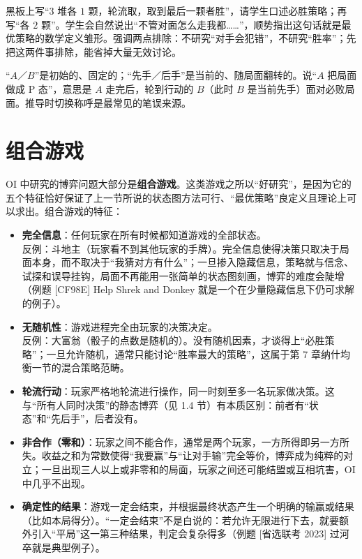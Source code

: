 \documentclass[UTF8,a4paper,11pt,oneside,openany,fontset=fandol]{ctexbook}
\theoremstyle{definition}
\begin{document}
\begin{teach}[导入：从“必胜”这个词开始]
黑板上写“$3$ 堆各 $1$ 颗，轮流取，取到最后一颗者胜”，请学生口述必胜策略；再写“各 $2$ 颗”。学生会自然说出“不管对面怎么走我都……”，顺势指出这句话就是最优策略的数学定义雏形。强调两点排除：不研究“对手会犯错”，不研究“胜率”；先把这两件事排除，能省掉大量无效讨论。
\end{teach}
\begin{pitfall}[两套称呼不要混用]
“$A$／$B$”是初始的、固定的；“先手／后手”是当前的、随局面翻转的。说“$A$ 把局面做成 P 态”，意思是 $A$ 走完后，轮到行动的 $B$（此时 $B$ 是当前先手）面对必败局面。推导时切换称呼是最常见的笔误来源。
\end{pitfall}

\section{组合游戏}
OI 中研究的博弈问题大部分是\textbf{组合游戏}。这类游戏之所以“好研究”，是因为它的五个特征恰好保证了上一节所说的状态图方法可行、“最优策略”良定义且理论上可以求出。组合游戏的特征：
\begin{itemize}
\item \textbf{完全信息}：任何玩家在所有时候都知道游戏的全部状态。\\
反例：斗地主（玩家看不到其他玩家的手牌）。完全信息使得决策只取决于局面本身，而不取决于“我猜对方有什么”；一旦掺入隐藏信息，策略就与信念、试探和误导挂钩，局面不再能用一张简单的状态图刻画，博弈的难度会陡增（例题 [CF98E] Help Shrek and Donkey 就是一个在少量隐藏信息下仍可求解的例子）。
\item \textbf{无随机性}：游戏进程完全由玩家的决策决定。\\
反例：大富翁（骰子的点数是随机的）。没有随机因素，才谈得上“必胜策略”；一旦允许随机，通常只能讨论“胜率最大的策略”，这属于第 7 章纳什均衡一节的混合策略范畴。
\item \textbf{轮流行动}：玩家严格地轮流进行操作，同一时刻至多一名玩家做决策。这与“所有人同时决策”的静态博弈（见 1.4 节）有本质区别：前者有“状态”和“先后手”，后者没有。
\item \textbf{非合作（零和）}：玩家之间不能合作，通常是两个玩家，一方所得即另一方所失。收益之和为常数使得“我要赢”与“让对手输”完全等价，博弈成为纯粹的对立；一旦出现三人以上或非零和的局面，玩家之间还可能结盟或互相坑害，OI 中几乎不出现。
\item \textbf{确定性的结果}：游戏一定会结束，并根据最终状态产生一个明确的输赢或结果（比如本局得分）。“一定会结束”不是白说的：若允许无限进行下去，就要额外引入“平局”这一第三种结果，判定会复杂得多（例题 [省选联考 2023] 过河卒就是典型例子）。
\end{itemize}
\end{document}
